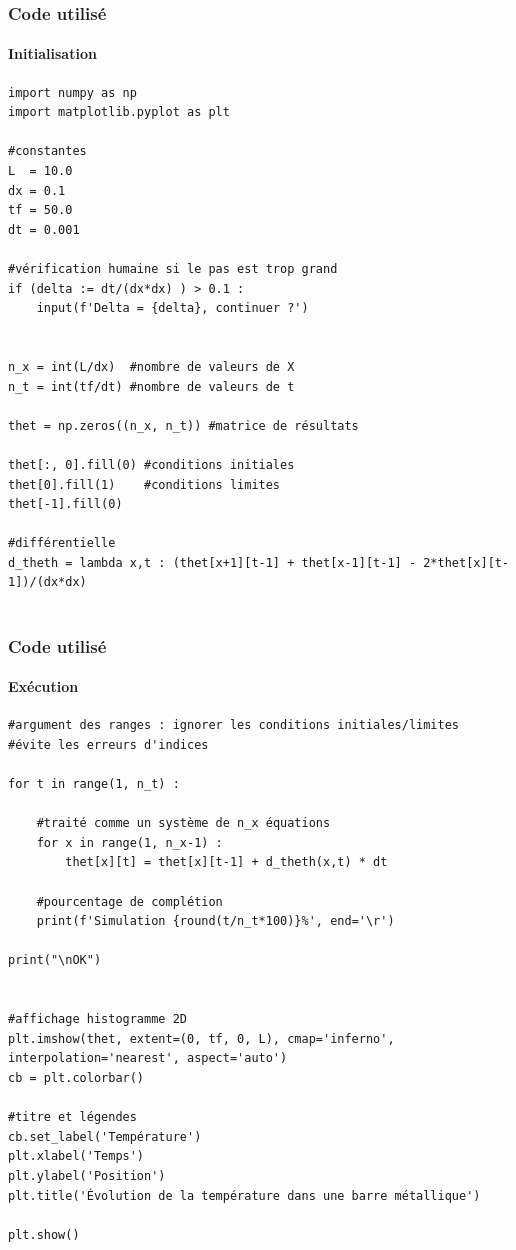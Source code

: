 \documentclass{beamer}
\begin{document}
	\begin{frame}[fragile]
    \frametitle{Code utilisé}
    \framesubtitle{Initialisation}

\begin{verbatim}
import numpy as np
import matplotlib.pyplot as plt

#constantes
L  = 10.0
dx = 0.1
tf = 50.0
dt = 0.001

#vérification humaine si le pas est trop grand
if (delta := dt/(dx*dx) ) > 0.1 :
    input(f'Delta = {delta}, continuer ?')


n_x = int(L/dx)  #nombre de valeurs de X
n_t = int(tf/dt) #nombre de valeurs de t

thet = np.zeros((n_x, n_t)) #matrice de résultats

thet[:, 0].fill(0) #conditions initiales
thet[0].fill(1)    #conditions limites
thet[-1].fill(0)

#différentielle
d_theth = lambda x,t : (thet[x+1][t-1] + thet[x-1][t-1] - 2*thet[x][t-1])/(dx*dx)


\end{verbatim}


    \end{frame}



    \begin{frame}[fragile]
    \frametitle{Code utilisé}
    \framesubtitle{Exécution}

\begin{verbatim}
#argument des ranges : ignorer les conditions initiales/limites
#évite les erreurs d'indices

for t in range(1, n_t) :

    #traité comme un système de n_x équations
    for x in range(1, n_x-1) :
        thet[x][t] = thet[x][t-1] + d_theth(x,t) * dt

    #pourcentage de complétion
    print(f'Simulation {round(t/n_t*100)}%', end='\r')

print("\nOK")


#affichage histogramme 2D
plt.imshow(thet, extent=(0, tf, 0, L), cmap='inferno', interpolation='nearest', aspect='auto')
cb = plt.colorbar()

#titre et légendes
cb.set_label('Température')
plt.xlabel('Temps')
plt.ylabel('Position')
plt.title('Évolution de la température dans une barre métallique')

plt.show()
\end{verbatim}


    \end{frame}
\end{document}
